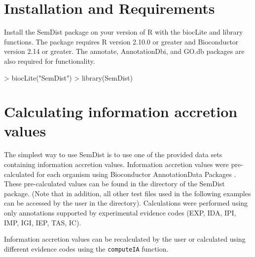 \documentclass{article}
\begin{document}
\section{Installation and Requirements}

Install the SemDist package on your version of R with the biocLite and library functions. The package requires R version 2.10.0 or greater and Bioconductor version 2.14 or greater. The annotate, AnnotationDbi, and GO.db packages are also required for functionality.
\begin{Schunk}
\begin{Sinput}
> biocLite("SemDist")
> library(SemDist)
\end{Sinput}
\end{Schunk}

\section{Calculating information accretion values}

The simplest way to use SemDist is to use one of the provided data sets containing information accretion values. Information accretion values were pre-calculated for each organism using Bioconductor AnnotationData Packages \citep{Anno}. These pre-calculated values can be found in the  directory of the SemDist package. (Note that in addition, all other test files used in the following examples can be accessed by the user in the  directory). Calculations were performed using only annotations supported by experimental evidence codes (EXP, IDA, IPI, IMP, IGI, IEP, TAS, IC). 

Information accretion values can be recalculated by the user or calculated using different evidence codes using the \texttt{computeIA} function.
\end{document}
